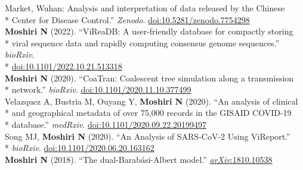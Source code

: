\documentclass[margin,line]{res}
\begin{document}
\begin{resume}
\hspace*{9mm} Market, Wuhan: Analysis and interpretation of data released by the Chinese\\*\vspace{2mm}
\hspace*{8mm} Center for Disease Control.'' \textit{Zenodo}. \href{https://doi.org/10.5281/zenodo.7754298}{doi:10.5281/zenodo.7754298}\\
\hspace*{4mm} \textbf{Moshiri N} (2022). ``ViReaDB: A user-friendly database for compactly storing\\*
\hspace*{9mm} viral sequence data and rapidly computing consensus genome sequences.'' \textit{bioRxiv}.\\*\vspace{2mm}
\hspace*{8mm} \href{https://doi.org/10.1101/2022.10.21.513318}{doi:10.1101/2022.10.21.513318}\\
\hspace*{4mm} \textbf{Moshiri N} (2020). ``CoaTran: Coalescent tree simulation along a transmission\\*\vspace{2mm}
\hspace*{8mm} network.'' \textit{bioRxiv}. \href{https://doi.org/10.1101/2020.11.10.377499}{doi:10.1101/2020.11.10.377499}\\
\hspace*{4mm} Velazquez A, Bustria M, Ouyang Y, \textbf{Moshiri N} (2020). ``An analysis of clinical\\*
\hspace*{9mm} and geographical metadata of over 75,000 records in the GISAID COVID-19\\*\vspace{2mm}
\hspace*{8mm} database.'' \textit{medRxiv}. \href{https://doi.org/10.1101/2020.09.22.20199497}{doi:10.1101/2020.09.22.20199497}\\
\hspace*{4mm} Song MJ, \textbf{Moshiri N} (2020). ``An Analysis of SARS-CoV-2 Using ViReport.''\\*\vspace{2mm}
\hspace*{8mm} \textit{bioRxiv}. \href{https://doi.org/10.1101/2020.06.20.163162}{doi:10.1101/2020.06.20.163162}\\
\hspace*{4mm} \vspace{2mm}\textbf{Moshiri N} (2018). ``The dual-Barab\'asi-Albert model.'' \href{https://arxiv.org/abs/1810.10538}{\textit{arXiv}:1810.10538}\\

\end{resume}
\end{document}
